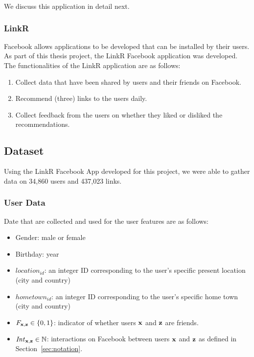 We discuss this application in detail next.

\subsubsection{LinkR}

Facebook allows applications to be developed that can be installed by
their users.  As part of this thesis project, the LinkR Facebook
application was developed.  The functionalities of the LinkR application
are as follows:
\begin{enumerate}
\item{Collect data that have been shared by users and their friends on Facebook.}
\item{Recommend (three) links to the users daily.}
\item{Collect feedback from the users on whether they liked or disliked the recommendations.}
\end{enumerate}



\subsection{Dataset}

\label{sec:dataset}

Using the LinkR Facebook App developed for this project, we were able
to gather data on 34,860 users and 437,023 links.

\subsubsection{User Data}

Date that are collected and used for the user features are as follows:
\begin{itemize}
\item {Gender:} male or female
\item {Birthday:} year
\item {$\mathit{location}_\mathit{id}$:} an integer ID corresponding
to the user's specific present location (city and country)
\item {$\mathit{hometown}_\mathit{id}$:} an integer ID corresponding
to the user's specific home town (city and country)
\item {$F_{\mathbf{x},\mathbf{z}} \in \{ 0, 1\}$:} indicator of whether 
users $\mathbf{x}$ and $\mathbf{z}$ are friends.
\item {$\mathit{Int}_{\mathbf{x},\mathbf{z}} \in \mathbb{N}$:} interactions on
Facebook between users $\mathbf{x}$ and $\mathbf{z}$ as defined in Section~\ref{sec:notation}.
\end{itemize}

